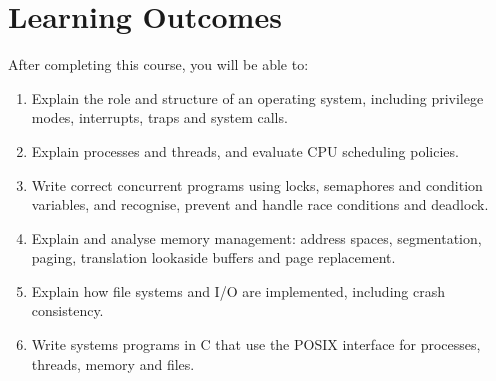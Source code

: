 \documentclass[11pt,a4paper]{article}
\begin{document}
\section{Learning Outcomes}
After completing this course, you will be able to:
\begin{enumerate}[label=LO\arabic*.]
  \item Explain the role and structure of an operating system, including privilege modes, interrupts, traps and system calls.
  \item Explain processes and threads, and evaluate CPU scheduling policies.
  \item Write correct concurrent programs using locks, semaphores and condition variables, and recognise, prevent and handle race conditions and deadlock.
  \item Explain and analyse memory management: address spaces, segmentation, paging, translation lookaside buffers and page replacement.
  \item Explain how file systems and I/O are implemented, including crash consistency.
  \item Write systems programs in C that use the POSIX interface for processes, threads, memory and files.
\end{enumerate}
\end{document}
